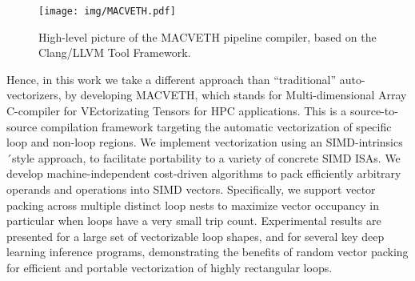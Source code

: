 \begin{figure*}
	\centering
	\texttt{[image: img/MACVETH.pdf]}
	\caption{High-level picture of the MACVETH pipeline compiler, based on the
		Clang/LLVM Tool Framework.}
	\label{fig:MACVETHarch}
\end{figure*}

Hence, in this work we take a different approach than ``traditional''
auto-vectorizers, by developing MACVETH, which stands for Multi-dimensional
Array C-compiler for VEctorizating Tensors for HPC applications. This is a
source-to-source compilation framework targeting the automatic vectorization of
specific loop and non-loop regions. We implement vectorization using an
SIMD-intrinsics ´style approach, to facilitate portability to a variety of
concrete SIMD ISAs. We develop machine-independent cost-driven algorithms to
pack efficiently arbitrary operands and operations into SIMD vectors.
Specifically, we support vector packing across multiple distinct loop nests to
maximize vector occupancy in particular when loops have a very small trip
count. Experimental results are presented for a large set of vectorizable loop
shapes, and for several key deep learning inference programs, demonstrating the
benefits of random vector packing for efficient and portable vectorization of
highly rectangular loops.
